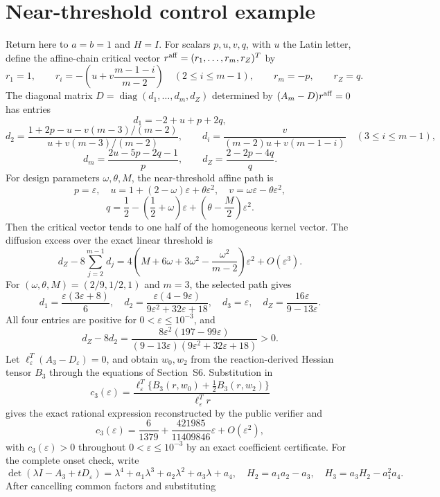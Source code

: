 \documentclass[10pt]{article}
\newcommand{\diag}{\operatorname{diag}}
\newcommand{\1}{\mathbf1}
\begin{document}
\section{Near-threshold control example}

Return here to $a=b=1$ and $H=I$.  For scalars $p,u,v,q$, with $u$ the
Latin letter, define the affine-chain critical vector
$r^{\rm aff}=(r_1,\ldots,r_m,r_Z)^T$ by
\[
 r_1=1,\qquad
 r_i=-\left(u+v\frac{m-1-i}{m-2}\right)
 \quad(2\le i\le m-1),
 \qquad r_m=-p,\qquad r_Z=q.
\]
The diagonal matrix $D=\diag(d_1,\ldots,d_m,d_Z)$ determined by
$(A_m-D)r^{\rm aff}=0$ has entries
\[
 d_1=-2+u+p+2q,
\]
\[
 d_2=
 \frac{1+2p-u-v(m-3)/(m-2)}
 {u+v(m-3)/(m-2)},
 \qquad
 d_i=\frac{v}{(m-2)u+v(m-1-i)}
 \quad(3\le i\le m-1),
\]
\[
 d_m=\frac{2u-5p-2q-1}{p},
 \qquad
 d_Z=\frac{2-2p-4q}{q}.
\]
For design parameters $\omega,\theta,M$, the near-threshold affine path is
\[
p=\varepsilon,\quad
u=1+(2-\omega)\varepsilon+\theta\varepsilon^2,\quad
v=\omega\varepsilon-\theta\varepsilon^2,
\]
\[
q=\frac12-\left(\frac12+\omega\right)\varepsilon
 +\left(\theta-\frac M2\right)\varepsilon^2.
\]
Then the critical vector tends to one half of the homogeneous kernel vector.  The
diffusion excess over the exact linear threshold is
\[
 d_Z-8\sum_{j=2}^{m-1}d_j
 =4\left(M+6\omega+3\omega^2-\frac{\omega^2}{m-2}\right)\varepsilon^2
 +O(\varepsilon^3).
\]
For $(\omega,\theta,M)=(2/9,1/2,1)$ and $m=3$, the selected path gives
\[
 d_1=\frac{\varepsilon(3\varepsilon+8)}6,\quad
 d_2=\frac{\varepsilon(4-9\varepsilon)}
 {9\varepsilon^2+32\varepsilon+18},\quad
 d_3=\varepsilon,\quad d_Z=\frac{16\varepsilon}{9-13\varepsilon}.
\]
All four entries are positive for $0<\varepsilon\le10^{-3}$, and
\[
 d_Z-8d_2=
 \frac{8\varepsilon^2(197-99\varepsilon)}
 {(9-13\varepsilon)(9\varepsilon^2+32\varepsilon+18)}>0.
\]
Let $\ell_\varepsilon^T(A_3-D_\varepsilon)=0$, and obtain $w_0,w_2$
from the reaction-derived Hessian tensor $B_3$ through the equations of
Section~S6.  Substitution in
\[
 c_3(\varepsilon)=
 \frac{\ell_\varepsilon^T\{B_3(r,w_0)+\tfrac12B_3(r,w_2)\}}
 {\ell_\varepsilon^Tr}
\]
gives the exact rational expression reconstructed by the public verifier and
\[
 c_3(\varepsilon)=\frac6{1379}
 +\frac{421985}{11409846}\varepsilon+O(\varepsilon^2),
\]
with $c_3(\varepsilon)>0$ throughout $0<\varepsilon\le10^{-3}$ by an exact
coefficient certificate.  For the complete onset check, write
\[
 \det(\lambda I-A_3+tD_\varepsilon)
 =\lambda^4+a_1\lambda^3+a_2\lambda^2+a_3\lambda+a_4,
 \quad H_2=a_1a_2-a_3,\quad H_3=a_3H_2-a_1^2a_4.
\]
After cancelling common factors and substituting
\end{document}
